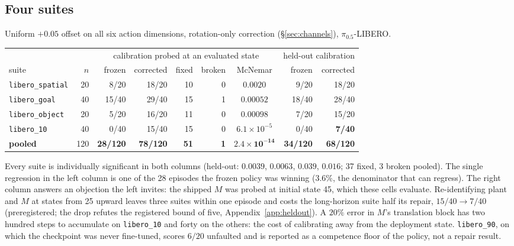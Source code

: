 \documentclass{article}
\newcommand{\code}[1]{\texttt{\small #1}}
\begin{document}
\subsection{Four suites}
\label{sec:headline}

Uniform $+0.05$ offset on all six action dimensions, rotation-only correction
(\S\ref{sec:channels}), $\pi_{0.5}$-LIBERO.

\begin{center}\small
\begin{tabular}{lrrrrrcrr}
\toprule
& & \multicolumn{5}{c}{calibration probed at an evaluated state} & \multicolumn{2}{c}{held-out calibration} \\
\cmidrule(lr){3-7}\cmidrule(lr){8-9}
suite & $n$ & frozen & corrected & fixed & broken & McNemar & frozen & corrected \\
\midrule
\code{libero\_spatial} & 20 & 8/20 & 18/20 & 10 & 0 & $0.0020$ & 9/20 & 18/20 \\
\code{libero\_goal}    & 40 & 15/40 & 29/40 & 15 & 1 & $0.00052$ & 18/40 & 28/40 \\
\code{libero\_object}  & 20 & 5/20 & 16/20 & 11 & 0 & $0.00098$ & 7/20 & 15/20 \\
\code{libero\_10}      & 40 & 0/40 & 15/40 & 15 & 0 & $6.1\times10^{-5}$ & 0/40 & \textbf{7/40} \\
\midrule
\textbf{pooled} & 120 & \textbf{28/120} & \textbf{78/120} & \textbf{51} & \textbf{1} & $\mathbf{2.4\times10^{-14}}$ & \textbf{34/120} & \textbf{68/120} \\
\bottomrule
\end{tabular}
\end{center}

Every suite is individually significant in both columns (held-out: $0.0039$, $0.0063$,
$0.039$, $0.016$; 37 fixed, 3 broken pooled). The single regression in the left column is one
of the 28 episodes the frozen policy was winning ($3.6\%$, the denominator that can regress).
The right column answers an objection the left invites: the shipped $M$ was probed at initial
state 45, which these cells evaluate. Re-identifying plant and $M$ at states from 25 upward
leaves three suites within one episode and costs the long-horizon suite half its repair,
$15/40\to7/40$ (preregistered; the drop refutes the registered bound of five,
Appendix~\ref{app:heldout}). A $20\%$ error in $M$'s translation block has two hundred steps to
accumulate on \code{libero\_10} and forty on the others: the cost of calibrating away from the
deployment state. \code{libero\_90}, on which the checkpoint was never fine-tuned,
scores $6/20$ unfaulted and is reported as a competence floor of the policy, not a repair
result.
\end{document}
